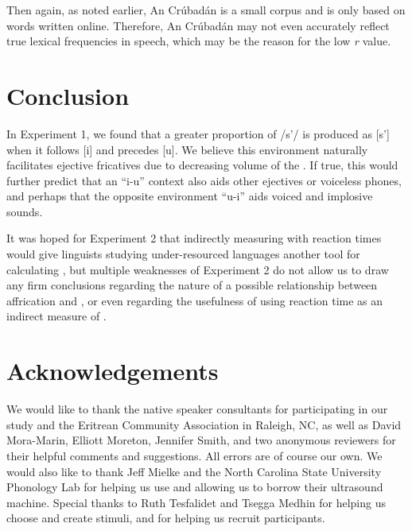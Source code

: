 \documentclass[output=paper,newtxmath,modfonts,nonflat,final]{langsci/langscibook}
\begin{document}
\largerpage
Then again, as noted earlier, An Crúbadán is a small corpus and is only based on words written online. Therefore, An Crúbadán may not even accurately reflect true lexical frequencies in speech, which may be the reason for the low \textit{r} value.

\section{Conclusion}\label{sec:moeng:7}

In Experiment 1, we found that a greater proportion of /s’/ is produced as [s’] when it follows [i] and precedes [u]. We believe this environment naturally facilitates ejective fricatives due to decreasing volume of the . If true, this would further predict that an “i-u” context also aids other ejectives or voiceless phones, and perhaps that the opposite environment “u-i” aids voiced and implosive sounds.

It was hoped for Experiment 2 that indirectly measuring  with reaction times would give linguists studying under-resourced languages another tool for calculating , but multiple weaknesses of Experiment 2 do not allow us to draw any firm conclusions regarding the nature of a possible relationship between affrication and , or even regarding the usefulness of using reaction time as an indirect measure of . 

\section*{Acknowledgements}

We would like to thank the native speaker consultants for participating in our study and the Eritrean Community Association in Raleigh, NC, as well as David Mora-Marin, Elliott Moreton, Jennifer Smith, and two anonymous reviewers for their helpful comments and suggestions. All errors are of course our own. We would also like to thank Jeff Mielke and the North Carolina State University Phonology Lab for helping us use and allowing us to borrow their ultrasound machine. Special thanks to Ruth Tesfalidet and Tsegga Medhin for helping us choose and create stimuli, and for helping us recruit participants.
 
\largerpage
\sloppy
\printbibliography[heading=subbibliography,notkeyword=this]
\end{document}
